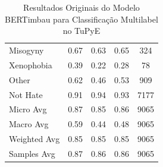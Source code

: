 \documentclass[sigconf,nonacm]{acmart}
\begin{document}
\begin{table}[H]
{\begin{tabular}{lcccc}
      Misogyny & 0.67 & 0.63 & 0.65 & 324 \\
      Xenophobia & 0.39 & 0.22 & 0.28 & 78 \\
      Other & 0.62 & 0.46 & 0.53 & 909 \\
      Not Hate & 0.91 & 0.94 & 0.93 & 7177 \\
      Micro Avg & 0.87 & 0.85 & 0.86 & 9065 \\
      Macro Avg & 0.59 & 0.44 & 0.48 & 9065 \\
      Weighted Avg & 0.85 & 0.85 & 0.85 & 9065 \\
      Samples Avg & 0.87 & 0.86 & 0.86 & 9065 \\
      \bottomrule
    \end{tabular}
  }
  \caption{Resultados Originais do Modelo BERTimbau para Classificação Multilabel no TuPyE \cite{oliveira2023tupye}}
  \label{tab:original_results_tupye}
\end{table}
\end{document}
